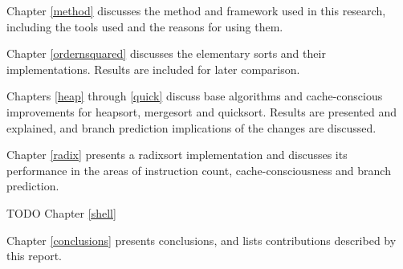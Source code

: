 Chapter \ref{method} discusses the method and framework used in this research, including the
tools used and the reasons for using them.

Chapter \ref{ordernsquared}  discusses the elementary sorts and their implementations. Results are
included for later comparison.

Chapters \ref{heap} through \ref{quick} discuss base algorithms and cache-conscious improvements
for heapsort, mergesort and quicksort. Results are presented and explained, and
branch prediction implications of the changes are discussed.

Chapter \ref{radix} presents a radixsort implementation and discusses its performance in
the areas of instruction count, cache-consciousness and branch prediction.

TODO Chapter \ref{shell}

Chapter \ref{conclusions} presents conclusions, and lists contributions
described by this report.
